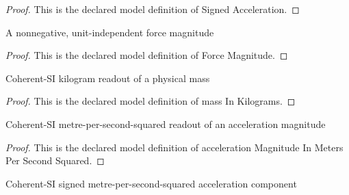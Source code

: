 \begin{proof}
  This is the declared model definition of Signed Acceleration.
\end{proof}
\begin{definition}
  \label{def:physics:phyx-mini-0762:phyxminiproblems-problemphyxmini0762-forcemagnitude}
  A nonnegative, unit-independent force magnitude
\end{definition}
\begin{proof}
  This is the declared model definition of Force Magnitude.
\end{proof}
\begin{definition}
  \label{def:physics:phyx-mini-0762:phyxminiproblems-problemphyxmini0762-massinkilograms}
  Coherent-SI kilogram readout of a physical mass
\end{definition}
\begin{proof}
  This is the declared model definition of mass In Kilograms.
\end{proof}
\begin{definition}
  \label{def:physics:phyx-mini-0762:phyxminiproblems-problemphyxmini0762-accelerationmagnitudeinmeterspersecondsquared}
  Coherent-SI metre-per-second-squared readout of an acceleration magnitude
\end{definition}
\begin{proof}
  This is the declared model definition of acceleration Magnitude In Meters Per Second Squared.
\end{proof}
\begin{definition}
  \label{def:physics:phyx-mini-0762:phyxminiproblems-problemphyxmini0762-signedaccelerationinmeterspersecondsquared}
  Coherent-SI signed metre-per-second-squared acceleration component
\end{definition}

